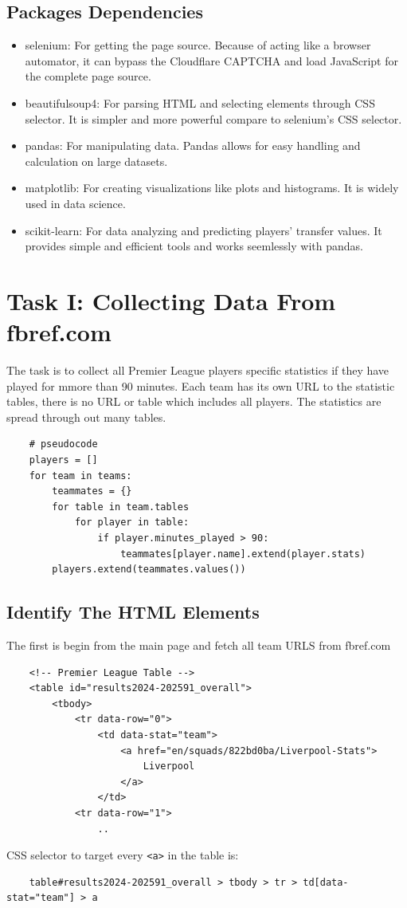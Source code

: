 \documentclass{report}
\begin{document}
\subsection{Packages Dependencies}
\begin{itemize}
    \item selenium: For getting the page source. Because of acting like a
    browser automator, it can bypass the Cloudflare CAPTCHA and load JavaScript for the 
    complete page source.
    \item beautifulsoup4: For parsing HTML and selecting elements through CSS 
    selector. It is simpler and more powerful compare to selenium's CSS selector.
    \item pandas: For manipulating data. Pandas allows for easy handling and 
    calculation on large datasets. 
    \item matplotlib: For creating visualizations like plots and histograms. 
    It is widely used in data science.
    \item scikit-learn: For data analyzing and predicting players' transfer values. 
    It provides simple and efficient tools and works seemlessly with pandas.
\end{itemize}

\section{Task I: Collecting Data From fbref.com}
The task is to collect all Premier League players specific statistics if they have played for 
mmore than 90 minutes. Each team has its own URL to the statistic tables, there is no URL or 
table which includes all players. The statistics are spread through out many tables.
\begin{verbatim}
    # pseudocode
    players = []
    for team in teams:
        teammates = {}
        for table in team.tables
            for player in table:
                if player.minutes_played > 90:
                    teammates[player.name].extend(player.stats)
        players.extend(teammates.values())
\end{verbatim}

\subsection{Identify The HTML Elements}
The first is begin from the main page and fetch all team URLS from fbref.com
\begin{verbatim}
    <!-- Premier League Table -->
    <table id="results2024-202591_overall">
        <tbody>
            <tr data-row="0">
                <td data-stat="team">
                    <a href="en/squads/822bd0ba/Liverpool-Stats">
                        Liverpool
                    </a>
                </td>
            <tr data-row="1">
                ..
\end{verbatim}
CSS selector to target every \verb|<a>| in the table is:
\begin{verbatim}
    table#results2024-202591_overall > tbody > tr > td[data-stat="team"] > a    
\end{verbatim}
\end{document}
